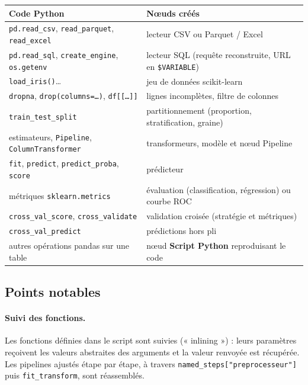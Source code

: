 \documentclass[11pt,a4paper]{article}
\newcommand{\code}[1]{\texttt{#1}}
\newcommand{\ui}[1]{\textsf{\textbf{#1}}}   %
\begin{document}
\begin{center}
\begin{tabularx}{\linewidth}{lX}
  \toprule
  \textbf{Code Python} & \textbf{Nœuds créés} \\
  \midrule
  \code{pd.read\_csv}, \code{read\_parquet}, \code{read\_excel} & lecteur CSV ou Parquet / Excel \\
  \code{pd.read\_sql}, \code{create\_engine}, \code{os.getenv} & lecteur SQL (requête reconstruite, URL en \code{\$VARIABLE}) \\
  \code{load\_iris()}… & jeu de données scikit-learn \\
  \code{dropna}, \code{drop(columns=…)}, \code{df[[…]]} & lignes incomplètes, filtre de colonnes \\
  \code{train\_test\_split} & partitionnement (proportion, stratification, graine) \\
  estimateurs, \code{Pipeline}, \code{ColumnTransformer} & transformeurs, modèle et nœud Pipeline \\
  \code{fit}, \code{predict}, \code{predict\_proba}, \code{score} & prédicteur \\
  métriques \code{sklearn.metrics} & évaluation (classification, régression) ou courbe ROC \\
  \code{cross\_val\_score}, \code{cross\_validate} & validation croisée (stratégie et métriques) \\
  \code{cross\_val\_predict} & prédictions hors pli \\
  autres opérations pandas sur une table & nœud \ui{Script Python} reproduisant le code \\
  \bottomrule
\end{tabularx}
\end{center}

\subsection{Points notables}

\paragraph{Suivi des fonctions.} Les fonctions définies dans le script sont suivies
(« inlining ») : leurs paramètres reçoivent les valeurs abstraites des arguments et
la valeur renvoyée est récupérée. Les pipelines ajustés étape par étape, à travers
\code{named\_steps["preprocesseur"]} puis \code{fit\_transform}, sont réassemblés.
\end{document}
